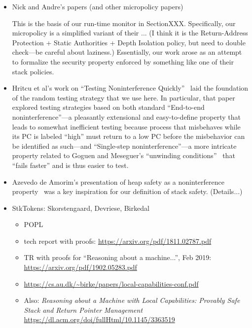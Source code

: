 \documentclass[conference]{IEEEtran}
\begin{document}
\begin{itemize}
\item Nick and Andre's papers (and other micropolicy papers)
\cite{DBLP:conf/sp/RoesslerD18}

This is the basis of our run-time monitor in Section{XXX}.  Specifically,
our micropolicy is a simplified variant of their ... (I think it is the
Return-Address Protection + Static Authorities + Depth Isolation policy, but
need to double check---be careful about laziness.)  Essentially, our work
arose as an attempt to formalize the security property enforced by something
like one of their stack policies.

\item Hritcu et al's work on ``Testing Noninterference
Quickly''~\cite{DBLP:journals/jfp/HritcuLSADHPV16} laid the
foundation of the random testing strategy that we use here.  In particular,
that paper explored testing strategies based on both standard ``End-to-end
noninterference''---a pleasantly extensional and easy-to-define property
that leads to somewhat inefficient testing because process that misbehaves
while its PC is labeled ``high'' must return to a low PC before the
misbehavior can be identified as such---and ``Single-step
noninterference''---a more intricate property related to Goguen and
Meseguer's ``unwinding conditions''~\cite{GoguenMeseguer85} that ``fails
faster'' and is thus easier to test.  

\item Azevedo de Amorim's presentation of heap safety as a noninterference
property~\cite{DBLP:conf/post/AmorimHP18} was a key inspiration for our
definition of stack safety.  (Details...)

\item StkTokens: Skorstengaard, Devriese, Birkedal
\begin{itemize}
\item POPL \cite{skorstengaard2019stktokens}
\item tech report with proofs: \cite{skorstengaard2018stktokens}
\url{https://arxiv.org/pdf/1811.02787.pdf}
\item TR with proofs for ``Reasoning about a machine...'', Feb 2019:
\url{https://arxiv.org/pdf/1902.05283.pdf}
\item \url{https://cs.au.dk/~birke/papers/local-capabilities-conf.pdf}
\item Also: {\em Reasoning about a Machine with Local Capabilities: Provably
  Safe Stack and Return Pointer Management} \cite{10.1145/3363519}
\url{https://dl.acm.org/doi/fullHtml/10.1145/3363519}


\end{itemize}
\end{itemize}
\end{document}
